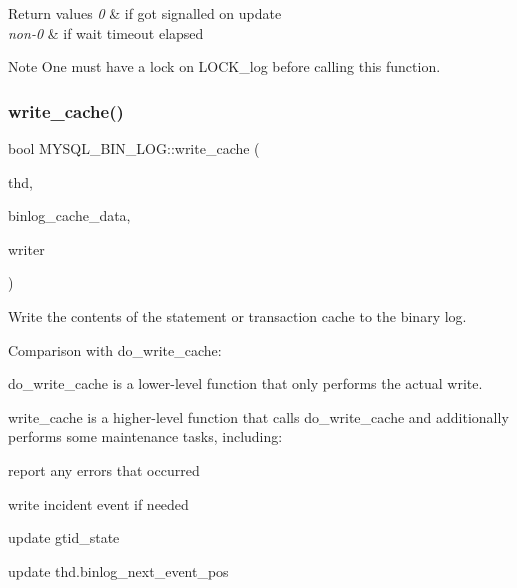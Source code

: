 \begin{DoxyRetVals}{Return values}
{\em 0} & if got signalled on update \\
\hline
{\em non-\/0} & if wait timeout elapsed\\
\hline
\end{DoxyRetVals}
\begin{DoxyNote}{Note}
One must have a lock on L\+O\+C\+K\+\_\+log before calling this function. 
\end{DoxyNote}
\mbox{\label{group__Binary__Log_gab0d497917a9a65893753ff92be180172}} 
\subsubsection{\texorpdfstring{write\+\_\+cache()}{write\_cache()}}
{\footnotesize\ttfamily bool M\+Y\+S\+Q\+L\+\_\+\+B\+I\+N\+\_\+\+L\+O\+G\+::write\+\_\+cache (\begin{DoxyParamCaption}\item[{T\+HD $\ast$}]{thd,  }\item[{class \mbox{\hyperlink{classbinlog__cache__data}{binlog\+\_\+cache\+\_\+data}} $\ast$}]{binlog\+\_\+cache\+\_\+data,  }\item[{class \mbox{\hyperlink{classBinlog__event__writer}{Binlog\+\_\+event\+\_\+writer}} $\ast$}]{writer }\end{DoxyParamCaption})}

Write the contents of the statement or transaction cache to the binary log.

Comparison with do\+\_\+write\+\_\+cache\+:


\begin{DoxyItemize}
\item do\+\_\+write\+\_\+cache is a lower-\/level function that only performs the actual write.
\item write\+\_\+cache is a higher-\/level function that calls do\+\_\+write\+\_\+cache and additionally performs some maintenance tasks, including\+:
\begin{DoxyItemize}
\item report any errors that occurred
\item write incident event if needed
\item update gtid\+\_\+state
\item update thd.\+binlog\+\_\+next\+\_\+event\+\_\+pos
\end{DoxyItemize}
\end{DoxyItemize}


